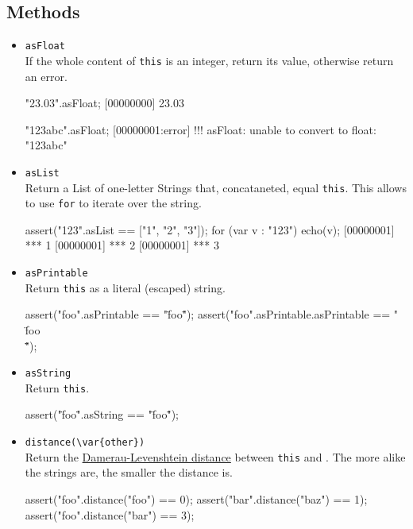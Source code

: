 \subsection{Methods}
\begin{itemize}
\item \lstinline|asFloat|\\
  If the whole content of \lstinline|this| is an integer, return its
  value, otherwise return an error.
\begin{urbiscript}[firstnumber=last]
"23.03".asFloat;
[00000000] 23.03

"123abc".asFloat;
[00000001:error] !!! asFloat: unable to convert to float: "123abc"
\end{urbiscript}

\item \lstinline|asList|\\
  Return a List of one-letter Strings that, concataneted, equal
  \lstinline|this|.  This allows to use \lstinline|for| to iterate
  over the string.
\begin{urbiscript}[firstnumber=last]
assert("123".asList == ["1", "2", "3"]);
for (var v : "123")
  echo(v);
[00000001] *** 1
[00000001] *** 2
[00000001] *** 3
\end{urbiscript}

\item \lstinline|asPrintable|\\
  Return \lstinline|this| as a literal (escaped) string.
\begin{urbiscript}[firstnumber=last]
assert("foo".asPrintable == "\"foo\"");
assert("foo".asPrintable.asPrintable == "\"\\\"foo\\\"\"");
\end{urbiscript}

\item \lstinline|asString|\\
  Return \lstinline|this|.
\begin{urbiscript}[firstnumber=last]
assert("\"foo\"".asString == "\"foo\"");
\end{urbiscript}

\item \lstinline|distance(\var{other})|\\
  Return the
  \href{http://en.wikipedia.org/wiki/Damerau-Levenshtein_distance}
  {Damerau-Levenshtein distance} between \lstinline|this| and
  .  The more alike the strings are, the smaller the
  distance is.
\begin{urbiscript}[firstnumber=last]
assert("foo".distance("foo") == 0);
assert("bar".distance("baz") == 1);
assert("foo".distance("bar") == 3);
\end{urbiscript}


\end{itemize}
